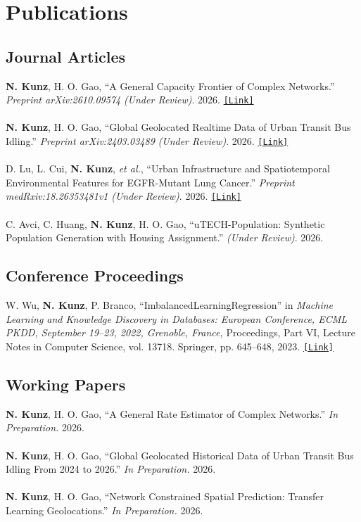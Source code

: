 \documentclass{article}
\begin{document}
\section*{Publications}
    \subsection*{Journal Articles}
        \textbf{N. Kunz}, H. O. Gao, ``A General Capacity Frontier of Complex Networks.'' \textit{Preprint arXiv:2610.09574} \textit{(Under Review)}. 2026. \href{https://arxiv.org/abs/2610.09574}{\texttt{[Link]}} \\~\\
    \textbf{N. Kunz}, H. O. Gao, ``Global Geolocated Realtime Data of Urban Transit Bus Idling.'' \textit{Preprint arXiv:2403.03489} \textit{(Under Review)}. 2026. \href{https://doi.org/10.48550/arXiv.2403.03489}{\texttt{[Link]}} \\~\\
        D. Lu, L. Cui, \textbf{N. Kunz}, \textit{et al.}, ``Urban Infrastructure and Spatiotemporal Environmental Features for EGFR-Mutant Lung Cancer.'' \textit{Preprint medRxiv:18.26353481v1} \textit{(Under Review)}. 2026. \href{https://doi.org/10.64898/2026.05.18.26353481}{\texttt{[Link]}}\\~\\
        C. Avci, C. Huang, \textbf{N. Kunz}, H. O. Gao, ``uTECH-Population: Synthetic Population Generation with Housing Assignment.'' \textit{(Under Review)}. 2026.
    \subsection*{Conference Proceedings}
        W. Wu, \textbf{N. Kunz}, P. Branco, ``ImbalancedLearningRegression'' in \textit{Machine Learning and Knowledge Discovery in Databases: European Conference, ECML PKDD, September 19–23, 2022, Grenoble, France,} Proceedings, Part VI, Lecture Notes in Computer Science, vol. 13718. Springer, pp. 645–648, 2023. \href{https://link.springer.com/chapter/10.1007/978-3-031-26422-1_48}{\texttt{[Link]}}
    \subsection*{Working Papers}
        \textbf{N. Kunz}, H. O. Gao, ``A General Rate Estimator of Complex Networks.'' \textit{In Preparation.} 2026.\\~\\
        \textbf{N. Kunz}, H. O. Gao, ``Global Geolocated Historical Data of Urban Transit Bus Idling From 2024 to 2026.'' \textit{In Preparation.} 2026.\\~\\
        \textbf{N. Kunz}, H. O. Gao, ``Network Constrained Spatial Prediction: Transfer Learning Geolocations.'' \textit{In Preparation.} 2026.
\end{document}
